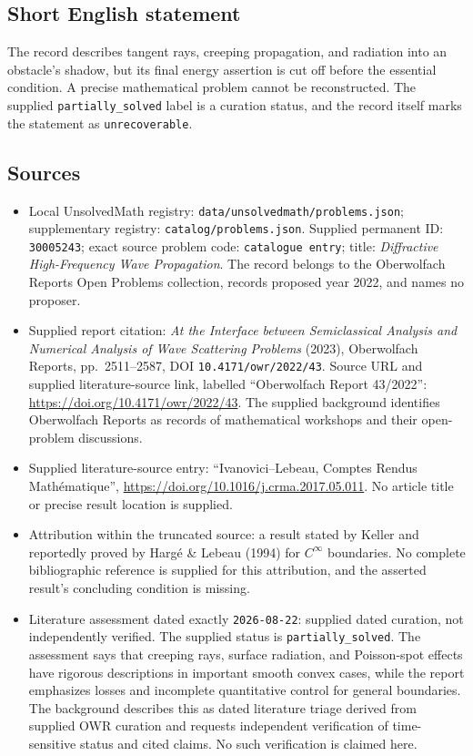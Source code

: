 \documentclass[11pt]{article}
\begin{document}
\subsection{Short English statement}
The record describes tangent rays, creeping propagation, and radiation into an obstacle's shadow, but its final energy assertion is cut off before the essential condition. A precise mathematical problem cannot be reconstructed. The supplied \texttt{partially\_solved} label is a curation status, and the record itself marks the statement as \texttt{unrecoverable}.
\subsection{Sources}
\begin{itemize}
\item Local UnsolvedMath registry: \texttt{data/unsolvedmath/problems.json}; supplementary registry: \texttt{catalog/problems.json}. Supplied permanent ID: \texttt{30005243}; exact source problem code: \texttt{catalogue entry}; title: \emph{Diffractive High-Frequency Wave Propagation}. The record belongs to the Oberwolfach Reports Open Problems collection, records proposed year 2022, and names no proposer.
\item Supplied report citation: \emph{At the Interface between Semiclassical Analysis and Numerical Analysis of Wave Scattering Problems} (2023), Oberwolfach Reports, pp.\ 2511--2587, DOI \texttt{10.4171/owr/2022/43}. Source URL and supplied literature-source link, labelled ``Oberwolfach Report 43/2022'': \url{https://doi.org/10.4171/owr/2022/43}. The supplied background identifies Oberwolfach Reports as records of mathematical workshops and their open-problem discussions.
\item Supplied literature-source entry: ``Ivanovici--Lebeau, Comptes Rendus Math\'ematique'', \url{https://doi.org/10.1016/j.crma.2017.05.011}. No article title or precise result location is supplied.
\item Attribution within the truncated source: a result stated by Keller and reportedly proved by Harg\'e \& Lebeau (1994) for $C^\infty$ boundaries. No complete bibliographic reference is supplied for this attribution, and the asserted result's concluding condition is missing.
\item Literature assessment dated exactly \texttt{2026-08-22}: supplied dated curation, not independently verified. The supplied status is \texttt{partially\_solved}. The assessment says that creeping rays, surface radiation, and Poisson-spot effects have rigorous descriptions in important smooth convex cases, while the report emphasizes losses and incomplete quantitative control for general boundaries. The background describes this as dated literature triage derived from supplied OWR curation and requests independent verification of time-sensitive status and cited claims. No such verification is claimed here.
\end{itemize}
\end{document}

